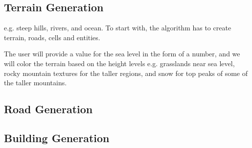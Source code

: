 \subsection{Terrain Generation}

e.g. steep hills, rivers, and ocean.
To start with, the algorithm has to create terrain, roads, cells and entities. 

The user will provide a value for the sea level in the form of a number, and we will color the terrain based on the height levels e.g. grasslands near sea level, rocky mountain textures for the taller regions, and snow for top peaks of some of the taller mountains.

\subsection{Road Generation}
\subsection{Building Generation}